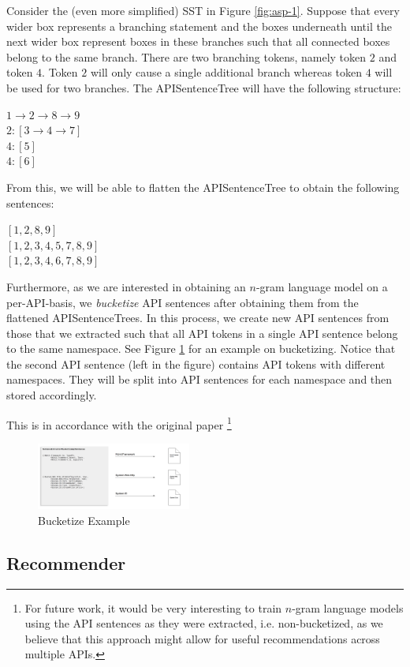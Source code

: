 Consider the (even more simplified) SST in Figure \ref{fig:asp-1}. Suppose that every wider box represents a branching statement and the boxes underneath until the next wider box represent boxes in these branches such that all connected boxes belong to the same branch.
There are two branching tokens, namely token $2$ and token $4$. Token $2$ will only cause a single additional branch whereas token $4$ will be used for two branches.
The APISentenceTree will have the following structure:

\begin{center}
	\mbox{$1 \rightarrow 2 \rightarrow 8 \rightarrow 9$}\\
	\mbox{$2: [3 \rightarrow 4 \rightarrow 7]$}\\
	\mbox{$4: [5]$}\\
	\mbox{$4: [6]$}
\end{center}

From this, we will be able to flatten the APISentenceTree to obtain the following sentences:

\begin{center}
	\mbox{$[1,2,8,9]$}\\
	\mbox{$[1,2,3,4,5,7,8,9]$}\\
	\mbox{$[1,2,3,4,6,7,8,9]$}
\end{center}

Furthermore, as we are interested in obtaining an $n$-gram language model on a per-API-basis, we \textit{bucketize} API sentences after obtaining them from the flattened APISentenceTrees. In this process, we create new API sentences from those that we extracted such that all API tokens in a single API sentence belong to the same namespace. See Figure \ref{fig:bucketize-ex1} for an example on bucketizing. Notice that the second API sentence (left in the figure) contains API tokens with different namespaces. They will be split into API sentences for each namespace and then stored accordingly.

This is in accordance with the original paper \cite{Santos2017stepwise}\footnote{For future work, it would be very interesting to train $n$-gram language models using the API sentences as they were extracted, i.e. non-bucketized, as we believe that this approach might allow for useful recommendations across multiple APIs.}


\begin{figure}
	\centering
	\includegraphics[width=2in]{./section-chapter2/images/bucketize.jpg}
	\caption{Bucketize Example}
	\label{fig:bucketize-ex1}
\end{figure}




\subsection{Recommender}
